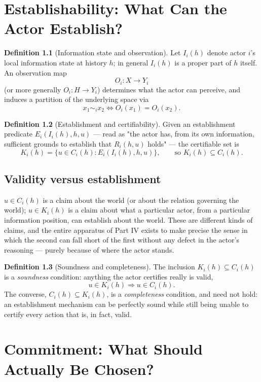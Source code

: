 \documentclass[11pt]{report}
\theoremstyle{definition}
\newtheorem{definition}{Definition}[chapter]
\theoremstyle{plain}
\begin{document}
\chapter{Establishability: What Can the Actor Establish?}

\begin{definition}[Information state and observation]
Let $I_i(h)$ denote actor $i$'s local information state at history $h$; in general $I_i(h)$ is a proper part of $h$ itself. An observation map
\[
O_i: X \to Y_i
\]
(or more generally $O_i: H \to Y_i$) determines what the actor can perceive, and induces a partition of the underlying space via
\[
x_1 \sim_i x_2 \iff O_i(x_1) = O_i(x_2).
\]
\end{definition}

\begin{definition}[Establishment and certifiability]
Given an establishment predicate $E_i(I_i(h),h,u)$ --- read as "the actor has, from its own information, sufficient grounds to establish that $R_i(h,u)$ holds" --- the certifiable set is
\[
K_i(h) = \{u \in C_i(h) : E_i(I_i(h),h,u)\}, \qquad\text{so } K_i(h) \subseteq C_i(h).
\]
\end{definition}

\section{Validity versus establishment}
$u \in C_i(h)$ is a claim about the world (or about the relation governing the world); $u \in K_i(h)$ is a claim about what a particular actor, from a particular information position, can establish about the world. These are different kinds of claims, and the entire apparatus of Part IV exists to make precise the sense in which the second can fall short of the first without any defect in the actor's reasoning --- purely because of where the actor stands.

\begin{definition}[Soundness and completeness]
The inclusion $K_i(h) \subseteq C_i(h)$ is a \emph{soundness} condition: anything the actor certifies really is valid,
\[
u \in K_i(h) \Rightarrow u \in C_i(h).
\]
The converse, $C_i(h) \subseteq K_i(h)$, is a \emph{completeness} condition, and need not hold: an establishment mechanism can be perfectly sound while still being unable to certify every action that is, in fact, valid.
\end{definition}

\chapter{Commitment: What Should Actually Be Chosen?}
\end{document}
